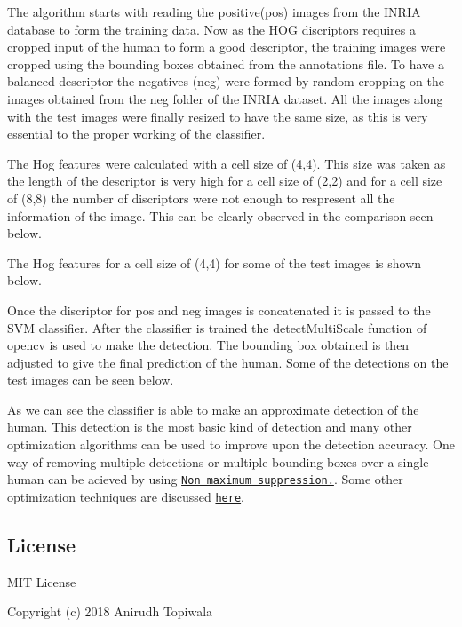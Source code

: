 The algorithm starts with reading the positive(pos) images from the I\+N\+R\+IA database to form the training data. Now as the H\+OG discriptors requires a cropped input of the human to form a good descriptor, the training images were cropped using the bounding boxes obtained from the annotations file. To have a balanced descriptor the negatives (neg) were formed by random cropping on the images obtained from the neg folder of the I\+N\+R\+IA dataset. All the images along with the test images were finally resized to have the same size, as this is very essential to the proper working of the classifier.

The Hog features were calculated with a cell size of (4,4). This size was taken as the length of the descriptor is very high for a cell size of (2,2) and for a cell size of (8,8) the number of discriptors were not enough to respresent all the information of the image. This can be clearly observed in the comparison seen below.

 

The Hog features for a cell size of (4,4) for some of the test images is shown below.

 

Once the discriptor for pos and neg images is concatenated it is passed to the S\+VM classifier. After the classifier is trained the detect\+Multi\+Scale function of opencv is used to make the detection. The bounding box obtained is then adjusted to give the final prediction of the human. Some of the detections on the test images can be seen below.

 

As we can see the classifier is able to make an approximate detection of the human. This detection is the most basic kind of detection and many other optimization algorithms can be used to improve upon the detection accuracy. One way of removing multiple detections or multiple bounding boxes over a single human can be acieved by using \href{https://www.pyimagesearch.com/2015/02/16/faster-non-maximum-suppression-python/}{\tt Non maximum suppression.}. Some other optimization techniques are discussed \href{https://stackoverflow.com/questions/26607418/improving-accuracy-opencv-hog-people-detector}{\tt here}.

\subsection*{License}

M\+IT License

Copyright (c) 2018 Anirudh Topiwala


